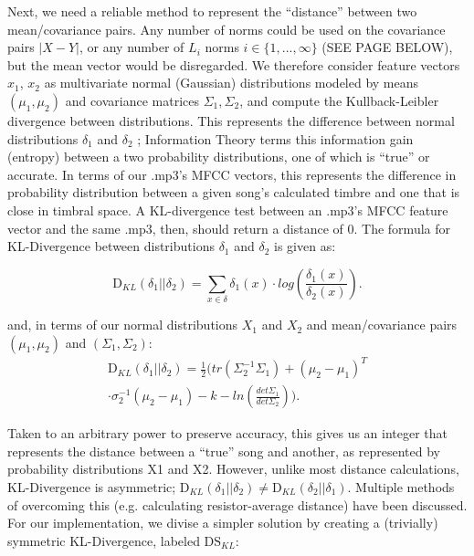 \documentclass[12pt,twocolumn,titlepage]{article}
\begin{document}
Next, we need a reliable method to represent the ``distance'' between two mean/covariance pairs. Any number of norms could be used on the covariance pairs $|X - Y|$, or any number of $L_i$ norms $i \in \{1,...,\infty\}$ (SEE PAGE BELOW), but the mean vector would be disregarded. We therefore consider feature vectors $x_1$, $x_2$ as multivariate normal (Gaussian) distributions modeled by means $(\mu_1, \mu_2)$ and covariance matrices $\Sigma_1, \Sigma_2$, and compute the Kullback-Leibler divergence between distributions. This represents the difference between normal distributions $\delta_1$ and $\delta_2$ \cite{ChiRussel-web}; Information Theory terms this information gain (entropy) between a two probability distributions, one of which is ``true'' or accurate. In terms of our .mp3's MFCC vectors, this represents the difference in probability distribution between a given song's calculated timbre and one that is close in timbral space. A KL-divergence test between an .mp3's MFCC feature vector and the same .mp3, then, should return a distance of 0. The formula for KL-Divergence between distributions $\delta_1$ and $\delta_2$ is given as:

\begin{equation}\label{}
\mathrm{D}_{KL}(\delta_1||\delta_2) = \sum_{x \in \delta}{}{\delta_1(x) \cdot log(\frac{\delta_1(x)}{\delta_2(x)})}.
\end{equation}

and, in terms of our normal distributions $X_1$ and $X_2$ and mean/covariance pairs $(\mu_1, \mu_2)$ and $(\Sigma_1, \Sigma_2)$:
\begin{multline}
\mathrm{D}_{KL}(\delta_1||\delta_2) = \frac{1}{2}\bigg(tr(\Sigma_2^{-1}\Sigma_1) + (\mu_2-\mu_1)^T \\
 \cdot \sigma_2^{-1}(\mu_2-\mu_1)-k-ln(\frac{det\Sigma_1}{det\Sigma_2})\bigg).
\end{multline}

Taken to an arbitrary power to preserve accuracy, this gives us an integer that represents the distance between a ``true'' song and another, as represented by probability distributions X1 and X2. However, unlike most distance calculations, KL-Divergence is asymmetric; $\mathrm{D}_{KL}(\delta_1 || \delta_2) \neq \mathrm{D}_{KL}(\delta_2 || \delta_1)$. Multiple methods of overcoming this (e.g. calculating resistor-average distance) \cite{JohnsonSinaovic} have been discussed. For our implementation, we divise a simpler solution by creating a (trivially) symmetric KL-Divergence, \cite{MaggbladeHongKao} labeled $\mathrm{DS}_{KL}$: 
\end{document}

